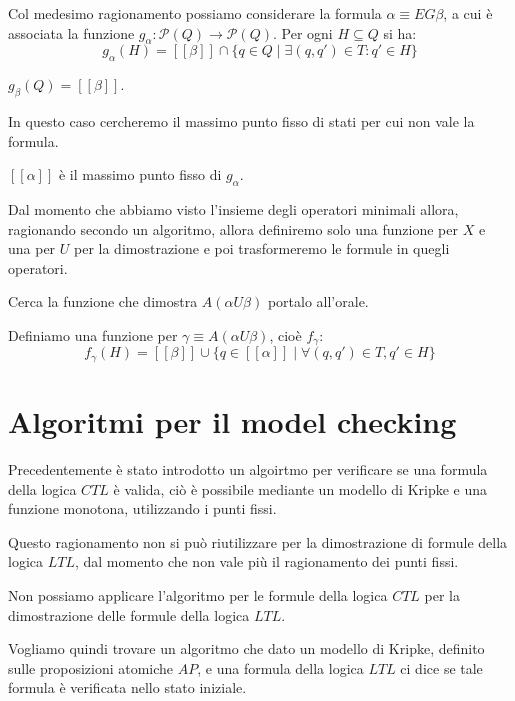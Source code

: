 Col medesimo ragionamento possiamo considerare la formula  $\alpha \equiv E G
    \beta$, a cui è associata la funzione $g_\alpha: \mathcal{P}(Q) \to \mathcal{P}(Q)$.
Per ogni $H \subseteq Q$ si ha:
\begin{equation}
    g_\alpha(H) = [[\beta]] \cap \{q \in Q \mid \exists(q, q') \in T: q ' \in H\}
\end{equation}
\begin{osservazione}
    $g_\beta (Q) = [[\beta]]$.
\end{osservazione}
In questo caso cercheremo il massimo punto fisso di stati per cui non vale la
formula.
\begin{center}
    $[[\alpha]]$ è il massimo punto fisso di $g_\alpha$.
\end{center}
Dal momento che abbiamo visto l'insieme degli operatori minimali allora,
ragionando secondo un algoritmo, allora definiremo solo una funzione per $X$ e
una per $U$ per la dimostrazione e poi trasformeremo le formule in quegli operatori.
\begin{nota}
    Cerca la funzione che dimostra $A(\alpha U \beta)$ portalo all'orale.
\end{nota}
Definiamo una funzione per $\gamma \equiv A(\alpha U \beta)$, cioè $f_\gamma$:
\begin{equation}
    f_\gamma(H) = [[\beta]] \cup \{q\in [[\alpha]] \mid \forall (q, q')\in T, q'\in H\}
\end{equation}
\section{Algoritmi per il model checking}
Precedentemente è stato introdotto un algoirtmo per verificare se una formula della
logica $CTL$ è valida, ciò è possibile mediante un modello di Kripke e una funzione
monotona, utilizzando i punti fissi.

Questo ragionamento non si può riutilizzare per la dimostrazione di formule della
logica $LTL$, dal momento che non vale più il ragionamento dei punti fissi.

\begin{nota}
    Non possiamo applicare l'algoritmo per le formule della logica $CTL$ per la 
    dimostrazione delle formule della logica $LTL$.
\end{nota}

Vogliamo quindi trovare un algoritmo che dato un modello di Kripke, definito sulle
proposizioni atomiche $AP$, e una formula della logica $LTL$ ci dice se tale
formula è verificata nello stato iniziale.

